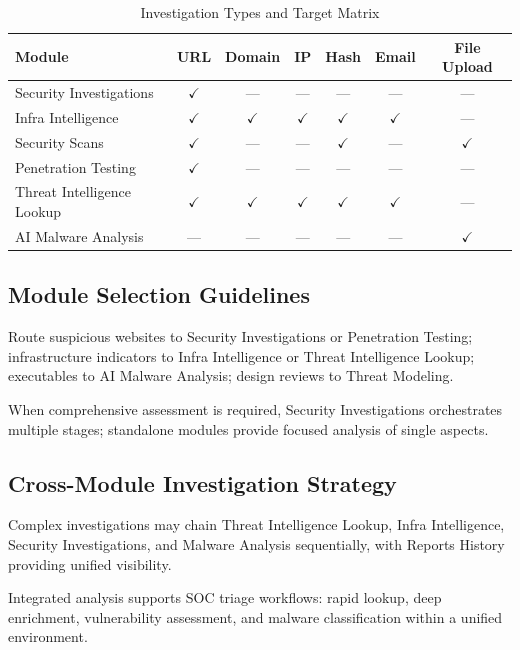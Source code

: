 \begin{table}[H]
\centering
\caption{Investigation Types and Target Matrix}
\label{tab:ch6_investigation_types_target_matrix}
\begin{tabular}{lcccccc}
\toprule
\textbf{Module} & \textbf{URL} & \textbf{Domain} & \textbf{IP} & \textbf{Hash} & \textbf{Email} & \textbf{File Upload} \\
\midrule
Security Investigations & $\checkmark$ & --- & --- & --- & --- & --- \\
Infra Intelligence & $\checkmark$ & $\checkmark$ & $\checkmark$ & $\checkmark$ & $\checkmark$ & --- \\
Security Scans & $\checkmark$ & --- & --- & $\checkmark$ & --- & $\checkmark$ \\
Penetration Testing & $\checkmark$ & --- & --- & --- & --- & --- \\
Threat Intelligence Lookup & $\checkmark$ & $\checkmark$ & $\checkmark$ & $\checkmark$ & $\checkmark$ & --- \\
AI Malware Analysis & --- & --- & --- & --- & --- & $\checkmark$ \\
\bottomrule
\end{tabular}
\end{table}

\subsection{Module Selection Guidelines}

Route suspicious websites to Security Investigations or Penetration Testing; infrastructure indicators to Infra Intelligence or Threat Intelligence Lookup; executables to AI Malware Analysis; design reviews to Threat Modeling.

When comprehensive assessment is required, Security Investigations orchestrates multiple stages; standalone modules provide focused analysis of single aspects.

\subsection{Cross-Module Investigation Strategy}

Complex investigations may chain Threat Intelligence Lookup, Infra Intelligence, Security Investigations, and Malware Analysis sequentially, with Reports History providing unified visibility.

Integrated analysis supports SOC triage workflows: rapid lookup, deep enrichment, vulnerability assessment, and malware classification within a unified environment.


